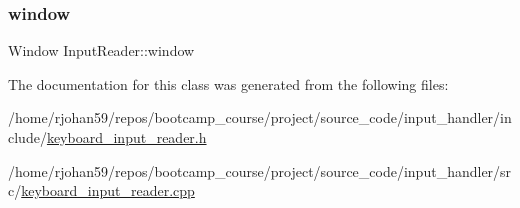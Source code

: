 \subsubsection{\texorpdfstring{window}{window}}
{\footnotesize\ttfamily Window Input\+Reader\+::window\hspace{0.3cm}{\ttfamily [private]}}



The documentation for this class was generated from the following files\+:\begin{DoxyCompactItemize}
\item 
/home/rjohan59/repos/bootcamp\+\_\+course/project/source\+\_\+code/input\+\_\+handler/include/\hyperlink{keyboard__input__reader_8h}{keyboard\+\_\+input\+\_\+reader.\+h}\item 
/home/rjohan59/repos/bootcamp\+\_\+course/project/source\+\_\+code/input\+\_\+handler/src/\hyperlink{keyboard__input__reader_8cpp}{keyboard\+\_\+input\+\_\+reader.\+cpp}\end{DoxyCompactItemize}
